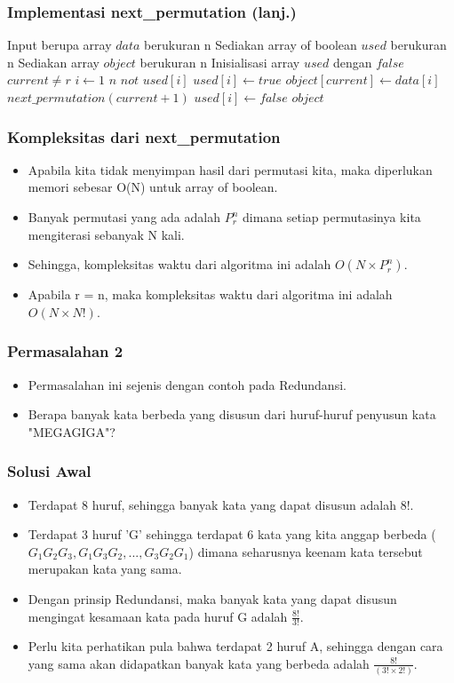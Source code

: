 \begin{frame}[fragile]
\frametitle{Implementasi next\_permutation (lanj.)}
\begin{codebox}
\li \Comment Input berupa array $data$ berukuran n
\li \Comment Sediakan array of boolean $used$ berukuran n
\li \Comment Sediakan array $object$ berukuran n
\li \Comment Inisialisasi array $used$ dengan $false$
\li \If $current \neq r$
    \Then
\li   \For $i \gets 1$ \To $n$
      \Do
\li     \If $not$ $used[i]$
        \Then
\li       $used[i] \gets true$
\li       $object[current] \gets data[i]$
\li       $next\_permutation(current+1)$
\li       $used[i] \gets false$
        \End
      \End
    \End
\li \Else
    \Then
\li   \Return $object$
\end{codebox}
\end{frame}

\begin{frame}
\frametitle{Kompleksitas dari next\_permutation}
\begin{itemize}
  \item Apabila kita tidak menyimpan hasil dari permutasi kita, maka diperlukan memori sebesar O(N) untuk array of boolean.
  \item Banyak permutasi yang ada adalah $P^{n}_{r}$ dimana setiap permutasinya kita mengiterasi sebanyak N kali.
  \item Sehingga, kompleksitas waktu dari algoritma ini adalah $O(N \times P^{n}_{r})$.
  \item Apabila r = n, maka kompleksitas waktu dari algoritma ini adalah $O(N \times N!)$.
\end{itemize}
\end{frame}

\begin{frame}
\frametitle{Permasalahan 2}
\begin{itemize}
  \item Permasalahan ini sejenis dengan contoh pada Redundansi.
  \item Berapa banyak kata berbeda yang disusun dari huruf-huruf penyusun kata "MEGAGIGA"?
\end{itemize}
\end{frame}

\begin{frame}
\frametitle{Solusi Awal}
\begin{itemize}
  \item Terdapat 8 huruf, sehingga banyak kata yang dapat disusun adalah $8!$.
  \item Terdapat 3 huruf 'G' sehingga terdapat 6 kata yang kita anggap berbeda ($G_{1}G_{2}G_{3}, G_{1}G_{3}G_{2}, ...,G_{3}G_{2}G_{1}$) dimana seharusnya keenam kata tersebut merupakan kata yang sama.
  \item Dengan prinsip Redundansi, maka banyak kata yang dapat disusun mengingat kesamaan kata pada huruf G adalah $\frac{8!}{3!}$.
  \item Perlu kita perhatikan pula bahwa terdapat 2 huruf A, sehingga dengan cara yang sama akan didapatkan banyak kata yang berbeda adalah $\frac{8!}{(3! \times 2!)}$.
\end{itemize}
\end{frame}

